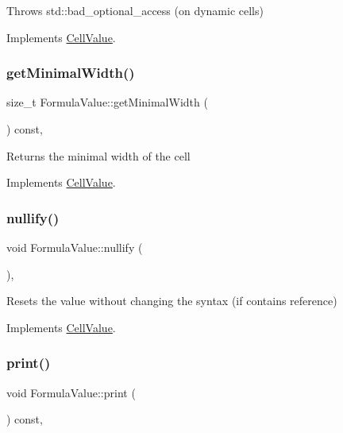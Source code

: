 Throws std\+::bad\+\_\+optional\+\_\+access (on dynamic cells) 

Implements \hyperlink{classCellValue_a3d2850b3a8473050fd46f486a29ed5bf}{Cell\+Value}.

\mbox{\label{classFormulaValue_a13abe74f12b5b201620d09e50237b195}} 
\subsubsection{\texorpdfstring{get\+Minimal\+Width()}{getMinimalWidth()}}
{\footnotesize\ttfamily size\+\_\+t Formula\+Value\+::get\+Minimal\+Width (\begin{DoxyParamCaption}{ }\end{DoxyParamCaption}) const\hspace{0.3cm}{\ttfamily [override]}, {\ttfamily [virtual]}}

Returns the minimal width of the cell 

Implements \hyperlink{classCellValue_ad96473ba3dd88b83da96c03ae31a2ede}{Cell\+Value}.

\mbox{\label{classFormulaValue_a43f76e805f909e32823cf44d4d1c6cb8}} 
\subsubsection{\texorpdfstring{nullify()}{nullify()}}
{\footnotesize\ttfamily void Formula\+Value\+::nullify (\begin{DoxyParamCaption}{ }\end{DoxyParamCaption})\hspace{0.3cm}{\ttfamily [override]}, {\ttfamily [virtual]}}

Resets the value without changing the syntax (if contains reference) 

Implements \hyperlink{classCellValue_af4f30a4b36e159f2f2bfc7ed83f1b37a}{Cell\+Value}.

\mbox{\label{classFormulaValue_a62217eb27ea02ca26f7636afb8f75b73}} 
\subsubsection{\texorpdfstring{print()}{print()}}
{\footnotesize\ttfamily void Formula\+Value\+::print (\begin{DoxyParamCaption}{ }\end{DoxyParamCaption}) const\hspace{0.3cm}{\ttfamily [override]}, {\ttfamily [virtual]}}

